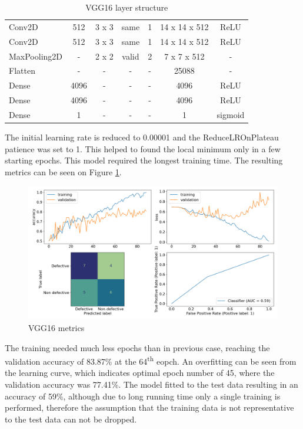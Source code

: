 \documentclass[10pt, final]{article}
\begin{document}
\begin{table}[!ht]
\begin{tabular}{l c c c c c c}
		Conv2D       & 512               & 3 x 3       & same    & 1      & 14 x 14 x 512   & ReLU       \\
		Conv2D       & 512               & 3 x 3       & same    & 1      & 14 x 14 x 512   & ReLU       \\
		MaxPooling2D & -                 & 2 x 2       & valid   & 2      & 7 x 7 x 512     & -          \\
		Flatten      & -                 & -           & -       & -      & 25088           & -          \\
		Dense        & 4096              & -           & -       & -      & 4096            & ReLU       \\
		Dense        & 4096              & -           & -       & -      & 4096            & ReLU       \\
		Dense        & 1                 & -           & -       & -      & 1               & sigmoid    \\
		\hline
	\end{tabular}
	\caption{VGG16 layer structure}
	\label{table:VGG16_struct}
\end{table}

The initial learning rate is reduced to 0.00001 and the ReduceLROnPlateau patience was set to 1.
This helped to found the local minimum only in a few starting epochs.
This model required the longest training time.
The resulting metrics can be seen on Figure \ref{fig:VGG16_metrics}.

\begin{figure}[!ht]
	\centering
	\includegraphics[width=\textwidth]{./tex_graphs/metrics_VGG16.png}
	\caption{VGG16 metrics}
	\label{fig:VGG16_metrics}
\end{figure}

The training needed much less epochs than in previous case, reaching the validation accuracy of 83.87\% at the
64\textsuperscript{th} eopch.
An overfitting can be seen from the learning curve, which indicates optimal epoch number of 45, where the
validation accuracy was 77.41\%.
The model fitted to the test data resulting in an accuracy of 59\%, although due to long running time only a single
training is performed, therefore the assumption that the training data is not representative to the test data
can not be dropped.
\end{document}
